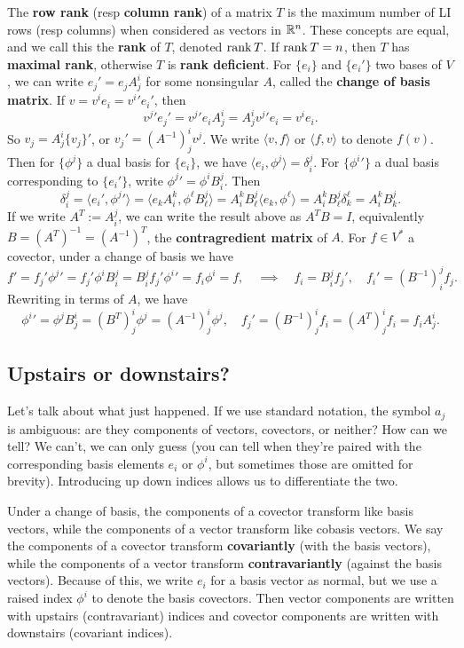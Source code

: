 The \textbf{row rank} (resp \textbf{column rank}) of a matrix $T$ is the maximum number of LI rows (resp columns) when considered as vectors in $\mathbb{R}^n $. These concepts are equal, and we call this the \textbf{rank} of $T$, denoted $\operatorname{rank} T$. If $\operatorname{rank} T=n$, then $T$ has \textbf{maximal rank}, otherwise $T$ is \textbf{rank deficient}. For $\{e_i \} $ and $\{e_i' \} $ two bases of $V$, we can write $e_j '=e_j A^i _j $ for some nonsingular $A$, called the \textbf{change of basis matrix}. If $v=v^i e_i ={v^i } 'e_i '$, then \[
{v^j } 'e_j' ={v^j } 'e_i A^i _j =A^i_j {v^j } 'e_i =v^i e_i .
\] So $v_j =A^i _j \{v_j \} '$, or $v_j '=(A^{-1})^i _j v^j $. We write $\langle v,f \rangle $ or $\langle f,v \rangle $ to denote $f(v)$. Then for $\{\phi^j \} $ a dual basis for $\{e_i \} $, we have $\langle e_i ,\phi^j  \rangle =\delta^j _i $. For $\{{\phi^i } '\} $ a dual basis corresponding to $\{e_i '\} $, write ${\phi^j } '=\phi^i B _i ^j $. Then \[
\delta^j _i =\langle e_i ',{\phi^j }'  \rangle =\langle e_kA^k_i ,\phi^{\ell}B^j _{\ell} \rangle =A^k_i B^j _{\ell}\langle e_k,\phi^{\ell} \rangle =A^k_i B^j _{\ell}\delta_k^{\ell}=A^k_i B_k^j .
\] If we write $A^T:=A^j _i $, we can write the result above as $A^TB=I$, equivalently $B=(A^T)^{-1}=(A^{-1})^T$, the \textbf{contragredient matrix} of $A$. For $f \in V^*$ a covector, under a change of basis we have \[
f'=f_j '{\phi^j } '=f_j '{\phi^i } B_i ^j =B^j _i f_j '{\phi^i } '=f_i \phi^i =f,\quad\implies\quad f_i=B^j _i f_j ',\quad f_i '=(B^{-1})^j _i f_j .
\] Rewriting in terms of $A$, we have \[
{\phi^i } '=\phi^j B_j ^i =(B^T)_j ^i \phi^j =(A^{-1})^i _j \phi^j ,\quad f_j '=(B^{-1})^i _j f_i =(A^T)^i _j f_i =f_i A^i _j .
\] 
\subsection{Upstairs or downstairs?}
Let's talk about what just happened. If we use standard notation, the symbol $a_j $ is ambiguous: are they components of vectors, covectors, or neither? How can we tell? We can't, we can only guess (you can tell when they're paired with the corresponding basis elements $e_i $ or $\phi^i $, but sometimes those are omitted for brevity). Introducing up down indices allows us to differentiate the two.

Under a change of basis, the components of a covector transform like basis vectors, while the components of a vector transform like cobasis vectors. We say the components of a covector transform \textbf{covariantly} (with the basis vectors), while the components of a vector transform \textbf{contravariantly} (against the basis vectors). Because of this, we write $e_i $ for a basis vector as normal, but we use a raised index $\phi^i $ to denote the basis covectors. Then vector components are written with upstairs (contravariant) indices and covector components are written with downstairs (covariant indices).

